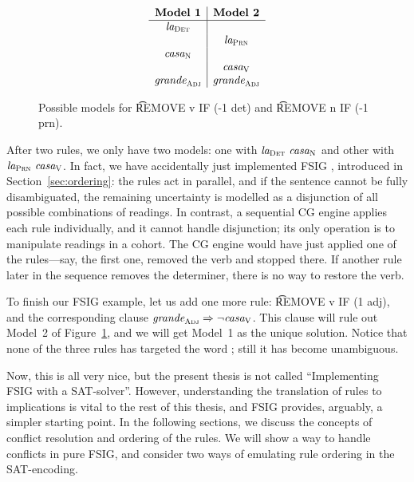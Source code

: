 \begin{figure}[h!]
\centering
$$\begin{array}{ c | c }
 \textbf{Model 1}  & \textbf{Model 2}  \\ \hline
 \laDet   &          \\
          &  \laPrn  \\
 \casaN   &          \\
          &  \casaV   \\
\grandeAdj & \grandeAdj \\

\end{array}$$
\caption{Possible models for \t{REMOVE v IF (-1 det)} and \t{REMOVE n IF (-1 prn)}.}
\label{fig:modelsTwoRules}
\end{figure}


After two rules, we only have two models: one with $\text{\em la}_{\text{\sc Det}} \ \text{\em casa}_{\text{\sc N}}$ and other with $\text{\em la}_{\text{\sc Prn}} \ \text{\em casa}_{\text{\sc V}}$. 
In fact, we have accidentally just implemented FSIG \cite{koskenniemi90}, introduced in Section~\ref{sec:ordering}: the rules act in parallel, and if the sentence cannot be fully disambiguated, the remaining uncertainty is modelled as a disjunction of all possible combinations of readings.
In contrast, a sequential CG engine applies each rule individually, and it cannot handle disjunction; its only operation is to manipulate readings in a cohort.
The CG engine would have just applied one of the rules---say, the first one, removed the verb and stopped there. If another rule later in the sequence removes the determiner, there is no way to restore the verb. 

To finish our FSIG example, let us add one more rule: \t{REMOVE v IF (1 adj)}, and the corresponding clause $\text{\em grande}_{\text{\sc Adj}} \Rightarrow \neg \text{\em casa}_{\text{\sc V}}$. This clause will rule out Model~2 of Figure~\ref{fig:modelsTwoRules}, and we will get Model~1 as the unique solution. 
Notice that none of the three rules has targeted the word \la{}; still it has become unambiguous. 

Now, this is all very nice, but the present thesis is not called ``Implementing FSIG with a SAT-solver''. 
However, understanding the translation of rules to implications is vital to the rest of this thesis, and FSIG provides, arguably, a simpler starting point.
In the following sections, we discuss the concepts of conflict resolution and ordering of the rules. We will show a way to handle conflicts in pure FSIG, and consider two ways of emulating rule ordering in the SAT-encoding.


